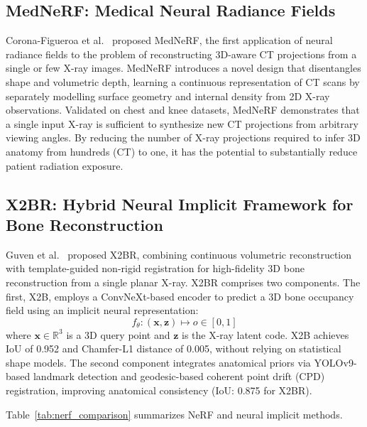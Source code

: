 \documentclass[10pt,twocolumn,a4paper]{article}
\begin{document}
\subsection{MedNeRF: Medical Neural Radiance Fields}
\label{sec:nerf:mednerf}

Corona-Figueroa et al.~\cite{mednerf} proposed MedNeRF, the first application of
neural radiance fields to the problem of reconstructing 3D-aware CT projections
from a single or few X-ray images. MedNeRF introduces a novel design that
disentangles shape and volumetric depth, learning a continuous representation of
CT scans by separately modelling surface geometry and internal density from 2D
X-ray observations. Validated on chest and knee datasets, MedNeRF demonstrates
that a single input X-ray is sufficient to synthesize new CT projections from
arbitrary viewing angles. By reducing the number of X-ray projections required
to infer 3D anatomy from hundreds (CT) to one, it has the potential to
substantially reduce patient radiation exposure.

\subsection{X2BR: Hybrid Neural Implicit Framework for Bone Reconstruction}
\label{sec:nerf:x2br}

Guven et al.~\cite{x2br} proposed X2BR, combining continuous volumetric
reconstruction with template-guided non-rigid registration for high-fidelity 3D
bone reconstruction from a single planar X-ray. X2BR comprises two components.
The first, X2B, employs a ConvNeXt-based encoder to predict a 3D bone occupancy
field using an implicit neural representation:
\begin{equation}
f_\theta: (\mathbf{x},\mathbf{z}) \mapsto o \in [0,1]
\label{eq:x2b}
\end{equation}
where $\mathbf{x} \in \mathbb{R}^3$ is a 3D query point and $\mathbf{z}$ is
the X-ray latent code. X2B achieves IoU of 0.952 and Chamfer-L1 distance of
0.005, without relying on statistical shape models. The second component
integrates anatomical priors via YOLOv9-based landmark detection and
geodesic-based coherent point drift (CPD) registration, improving anatomical
consistency (IoU: 0.875 for X2BR).

Table~\ref{tab:nerf_comparison} summarizes NeRF and neural implicit methods.
\end{document}
